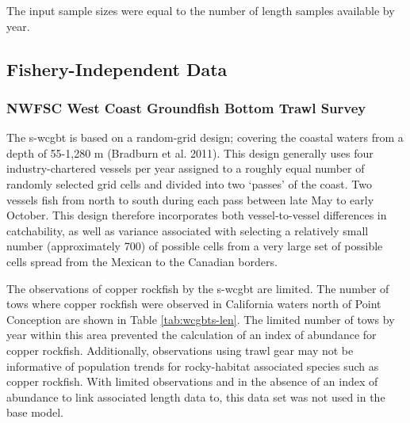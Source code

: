 \documentclass[11pt,
  english,
  a4paper,
]{article}
\begin{document}
\leavevmode\tagmcend\tagstructend\par


The input sample sizes were equal to the number of length samples available by year.

\leavevmode\tagmcend\tagstructend\par


\hypertarget{fishery-independent-data}{%
\subsection{Fishery-Independent Data}\label{fishery-independent-data}}

\leavevmode\tagmcend\tagstructend


\hypertarget{nwfsc-west-coast-groundfish-bottom-trawl-survey}{%
\subsubsection{NWFSC West Coast Groundfish Bottom Trawl Survey}\label{nwfsc-west-coast-groundfish-bottom-trawl-survey}}

\leavevmode\tagmcend\tagstructend


The \Gls{s-wcgbt} is based on a random-grid design; covering the coastal waters from a depth of 55-1,280 m {(Bradburn et al. 2011)\leavevmode\tagmcend\tagstructend}. This design generally uses four industry-chartered vessels per year assigned to a roughly equal number of randomly selected grid cells and divided into two `passes' of the coast. Two vessels fish from north to south during each pass between late May to early October. This design therefore incorporates both vessel-to-vessel differences in catchability, as well as variance associated with selecting a relatively small number (approximately 700) of possible cells from a very large set of possible cells spread from the Mexican to the Canadian borders.

\leavevmode\tagmcend\tagstructend\par


The observations of copper rockfish by the \Gls{s-wcgbt} are limited. The number of tows where copper rockfish were observed in California waters north of Point Conception are shown in Table \ref{tab:wcgbts-len}. The limited number of tows by year within this area prevented the calculation of an index of abundance for copper rockfish. Additionally, observations using trawl gear may not be informative of population trends for rocky-habitat associated species such as copper rockfish. With limited observations and in the absence of an index of abundance to link associated length data to, this data set was not used in the base model.
\end{document}
